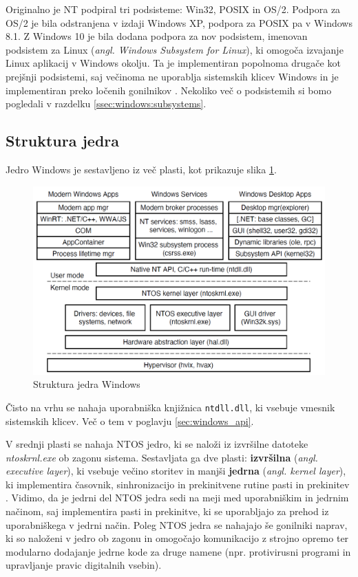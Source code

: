 \documentclass[a4paper,12pt,openright]{book}
\begin{document}
Originalno je NT podpiral tri podsisteme: Win32, POSIX in OS/2.
Podpora za OS/2 je bila odstranjena v izdaji Windows XP, podpora za POSIX pa v Windows 8.1.
Z Windows 10 je bila dodana podpora za nov podsistem, imenovan podsistem za Linux (\textit{angl. Windows Subsystem for Linux}), ki omogoča izvajanje Linux aplikacij v Windows okolju.
Ta je implementiran popolnoma drugače kot prejšnji podsistemi, saj večinoma ne uporablja sistemskih klicev Windows in je implementiran preko ločenih gonilnikov \cite{Yosifovich_Russinovich_Solomon_Ionescu_2017}.
Nekoliko več o podsistemih si bomo pogledali v razdelku \ref{ssec:windows:subsystems}.

\subsection{Struktura jedra}

Jedro Windows je sestavljeno iz več plasti, kot prikazuje slika \ref{fig:windows_kernel_structure}.

\begin{figure}[h!]
	\begin{center}
		\includegraphics[width=\textwidth]{images/windows_programming_layers.png}
	\end{center}
	\caption{Struktura jedra Windows \cite{Tanenbaum_Bos_2023}}
	\label{fig:windows_kernel_structure}
\end{figure}

Čisto na vrhu se nahaja uporabniška knjižnica \texttt{ntdll.dll}, ki vsebuje vmesnik sistemskih klicev.
Več o tem v poglavju \ref{sec:windows_api}.

V srednji plasti se nahaja NTOS jedro, ki se naloži iz izvršilne datoteke \textit{ntoskrnl.exe} ob zagonu sistema.
Sestavljata ga dve plasti: \textbf{izvršilna} (\textit{angl. executive layer}), ki vsebuje večino storitev in manjši \textbf{jedrna} (\textit{angl. kernel layer}), ki implementira časovnik, sinhronizacijo in prekinitvene rutine pasti in prekinitev \cite{Tanenbaum_Bos_2023}.
Vidimo, da je jedrni del NTOS jedra sedi na meji med uporabniškim in jedrnim načinom, saj implementira pasti in prekinitve, ki se uporabljajo za prehod iz uporabniškega v jedrni način.
Poleg NTOS jedra se nahajajo še gonilniki naprav, ki so naloženi v jedro ob zagonu in omogočajo komunikacijo z strojno opremo ter modularno dodajanje jedrne kode za druge namene (npr. protivirusni programi in upravljanje pravic digitalnih vsebin).
\end{document}
